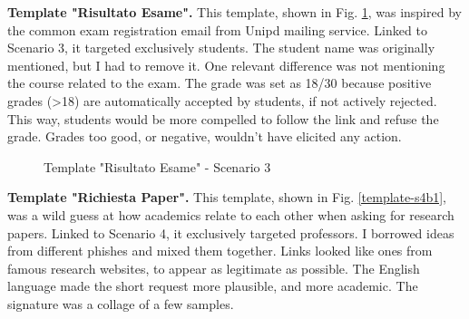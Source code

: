 \documentclass[a4paper]{article}
\begin{document}
\newpage

\noindent
\textbf{Template "Risultato Esame".} This template, shown in Fig. \ref{template-s3b1}, was inspired by the common exam registration email from Unipd mailing service. Linked to Scenario 3, it targeted exclusively students. The student name was originally mentioned, but I had to remove it. One relevant difference was not mentioning the course related to the exam. The grade was set as 18/30 because positive grades (>18) are automatically accepted by students, if not actively rejected. This way, students would be more compelled to follow the link and refuse the grade. Grades too good, or negative, wouldn't have elicited any action.

\hypertarget{template-s3b1}{}

\bigskip

\begin{figure}[H]
	\centering
	\caption{Template "Risultato Esame" - Scenario 3}
	\label{template-s3b1}
\end{figure}

\vspace{10mm}

\noindent
\textbf{Template "Richiesta Paper".} This template, shown in Fig. \ref{template-s4b1}, was a wild guess at how academics relate to each other when asking for research papers. Linked to Scenario 4, it exclusively targeted professors. I borrowed ideas from different phishes and mixed them together. Links looked like ones from famous research websites, to appear as legitimate as possible. The English language made the short request more plausible, and more academic. The signature was a collage of a few samples.

\hypertarget{template-s4b1}{}

\bigskip
\end{document}
